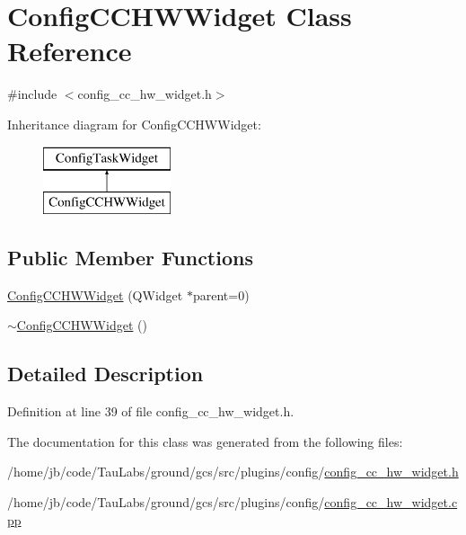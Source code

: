 \hypertarget{class_config_c_c_h_w_widget}{\section{\-Config\-C\-C\-H\-W\-Widget \-Class \-Reference}
\label{class_config_c_c_h_w_widget}
}


{\ttfamily \#include $<$config\-\_\-cc\-\_\-hw\-\_\-widget.\-h$>$}

\-Inheritance diagram for \-Config\-C\-C\-H\-W\-Widget\-:\begin{figure}[H]
\begin{center}
\leavevmode
\includegraphics[height=2.000000cm]{class_config_c_c_h_w_widget}
\end{center}
\end{figure}
\subsection*{\-Public \-Member \-Functions}
\begin{DoxyCompactItemize}
\item 
\hyperlink{group___config_plugin_ga7310551f62aff69c196b77b2680efb6b}{\-Config\-C\-C\-H\-W\-Widget} (\-Q\-Widget $\ast$parent=0)
\item 
\hyperlink{group___config_plugin_gaf57cdaf6ac0ff3096be01bbe4e6eea2b}{$\sim$\-Config\-C\-C\-H\-W\-Widget} ()
\end{DoxyCompactItemize}


\subsection{\-Detailed \-Description}


\-Definition at line 39 of file config\-\_\-cc\-\_\-hw\-\_\-widget.\-h.



\-The documentation for this class was generated from the following files\-:\begin{DoxyCompactItemize}
\item 
/home/jb/code/\-Tau\-Labs/ground/gcs/src/plugins/config/\hyperlink{config__cc__hw__widget_8h}{config\-\_\-cc\-\_\-hw\-\_\-widget.\-h}\item 
/home/jb/code/\-Tau\-Labs/ground/gcs/src/plugins/config/\hyperlink{config__cc__hw__widget_8cpp}{config\-\_\-cc\-\_\-hw\-\_\-widget.\-cpp}\end{DoxyCompactItemize}

